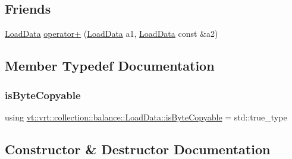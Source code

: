\subsection*{Friends}
\begin{DoxyCompactItemize}
\item 
\hyperlink{structvt_1_1vrt_1_1collection_1_1balance_1_1_load_data}{Load\+Data} \hyperlink{structvt_1_1vrt_1_1collection_1_1balance_1_1_load_data_a1e8bed4069f5d871e42c25dbea965ff8}{operator+} (\hyperlink{structvt_1_1vrt_1_1collection_1_1balance_1_1_load_data}{Load\+Data} a1, \hyperlink{structvt_1_1vrt_1_1collection_1_1balance_1_1_load_data}{Load\+Data} const \&a2)
\end{DoxyCompactItemize}


\subsection{Member Typedef Documentation}
\mbox{\label{structvt_1_1vrt_1_1collection_1_1balance_1_1_load_data_aea69efe107fdadc667193683ae468105}} 
\subsubsection{\texorpdfstring{is\+Byte\+Copyable}{isByteCopyable}}
{\footnotesize\ttfamily using \hyperlink{structvt_1_1vrt_1_1collection_1_1balance_1_1_load_data_aea69efe107fdadc667193683ae468105}{vt\+::vrt\+::collection\+::balance\+::\+Load\+Data\+::is\+Byte\+Copyable} =  std\+::true\+\_\+type}



\subsection{Constructor \& Destructor Documentation}
\mbox{\label{structvt_1_1vrt_1_1collection_1_1balance_1_1_load_data_afc2d1f780b2a168ec80f0cf28c830847}} 
